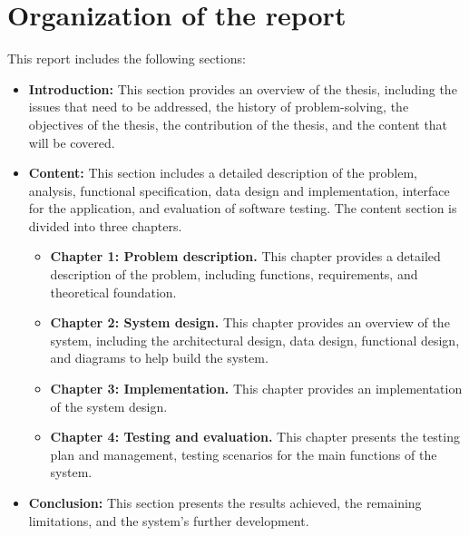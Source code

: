 \documentclass[../thesis.tex]{subfiles}
\begin{document}
\section{Organization of the report}
This report includes the following sections:
{
\renewcommand\labelitemi{}
\begin{itemize}
    \item \textbf{Introduction:} This section provides an overview of the thesis, including the issues that need to be addressed, the history of problem-solving, the objectives of the thesis, the contribution of the thesis, and the content that will be covered.
    \item \textbf{Content:} This section includes a detailed description of the problem, analysis, functional specification, data design and implementation, interface for the application, and evaluation of software testing. The content section is divided into three chapters.
          
    \begin{itemize}
              \item[] \textbf{Chapter 1: Problem description.} This chapter provides a detailed description of the problem, including functions, requirements, and theoretical foundation.
              \item[] \textbf{Chapter 2: System design.} This chapter provides an overview of the system, including the architectural design, data design, functional design, and diagrams to help build the system.
              \item[] \textbf{Chapter 3: Implementation.} This chapter provides an implementation of the system design.
              \item[] \textbf{Chapter 4: Testing and evaluation.} This chapter presents the testing plan and management, testing scenarios for the main functions of the system.
          \end{itemize}
    \item \textbf{Conclusion:}  This section presents the results achieved, the remaining limitations, and the system's further development.
\end{itemize}
}
\end{document}
